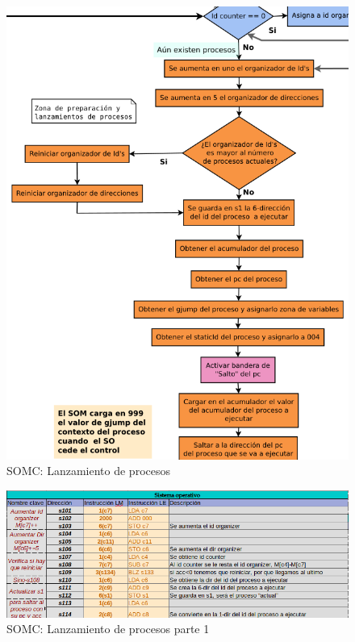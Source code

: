 \documentclass[letterpaper,12pt,oneside]{book}
\begin{document}
		
		\begin{figure}[h]		
			\centering
			\includegraphics[scale=0.48]{media/CARDIACC/diagLanzamientoProcesos.png}
			\caption{ SOMC: Lanzamiento de procesos}
			\label{fig:diagLanzProce}
		\end{figure}
		
		
		\begin{figure}[h]		
			\centering
			\includegraphics[scale=0.6]{media/CARDIACC/SO_EjecutarProceso.png}
			\caption{ SOMC: Lanzamiento de procesos parte 1}
			\label{fig:somcLanzamientoP1}
		\end{figure}
\end{document}
